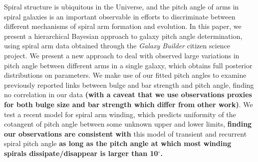 Spiral structure is ubiquitous in the Universe, and the pitch angle of arms in spiral galaxies is an important observable in efforts to discriminate between different mechanisms of spiral arm formation and evolution. In this paper, we present a hierarchical Bayesian approach to galaxy pitch angle determination, using spiral arm data obtained through the \textit{Galaxy Builder} citizen science project. We present a new approach to deal with observed large variations in pitch angle between different arms in a single galaxy, which obtains full posterior distributions on parameters. We make use of our fitted pitch angles to examine previously reported links between bulge and bar strength and pitch angle, finding no correlation in our data {\bf (with a caveat that we use observations proxies for both bulge size and bar strength which differ from other work)}. We test a recent model for spiral arm winding, which predicts uniformity of the cotangent of pitch angle between some unknown upper and lower limits, {\bf finding our observations are consistent with} this model of transient and recurrent spiral pitch angle {\bf as long as the pitch angle at which most winding spirals dissipate/disappear is larger than 10$^\circ$.}
